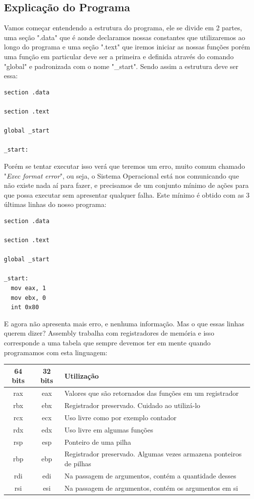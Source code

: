 \subsection{Explicação do Programa}

Vamos começar entendendo a estrutura do programa, ele se divide em 2 partes, uma seção ".data" que é aonde declaramos nossas constantes que utilizaremos ao longo do programa e uma seção ".text" que iremos iniciar as nossas funções porém uma função em particular deve ser a primeira e definida através do comando "global" e padronizada com o nome "\_start". Sendo assim a estrutura deve ser essa:
\begin{lstlisting}[]
section .data
	
section .text
	
global _start
	
_start:
\end{lstlisting}

Porém se tentar executar isso verá que teremos um erro, muito comum chamado "\textit{Exec format error}", ou seja, o Sistema Operacional está nos comunicando que não existe nada aí para fazer, e precisamos de um conjunto mínimo de ações para que possa executar sem apresentar qualquer falha. Este mínimo é obtido com as 3 últimas linhas do nosso programa:
\begin{lstlisting}[]
section .data

section .text

global _start

_start:
  mov eax, 1
  mov ebx, 0
  int 0x80
\end{lstlisting}

E agora não apresenta mais erro, e nenhuma informação. Mas o que essas linhas querem dizer? Assembly trabalha com registradores de memória e isso corresponde a uma tabela que sempre devemos ter em mente quando programamos com esta linguagem:
\begin{table}[H]
	\centering 
	\begin{tabular}{c | c | l }
		\textbf{64 bits} & \textbf{32 bits} & \textbf{Utilização} \\ \hline
		rax & eax & Valores que são retornados das funções em um registrador \\
		rbx & ebx & Registrador preservado. Cuidado ao utilizá-lo \\
		rcx & ecx & Uso livre como por exemplo contador \\
		rdx & edx & Uso livre em algumas funções \\
		rsp & esp & Ponteiro de uma pilha \\
		rbp & ebp & Registrador preservado. Algumas vezes armazena ponteiros de pilhas \\
		rdi & edi & Na passagem de argumentos, contém a quantidade desses \\
		rsi & esi & Na passagem de argumentos, contém os argumentos em si \\
	\end{tabular}
\end{table}

